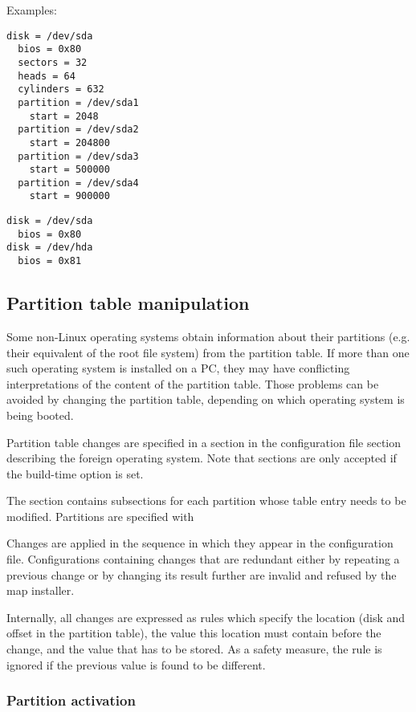 Examples:
\begin{verbatim}
disk = /dev/sda
  bios = 0x80
  sectors = 32
  heads = 64
  cylinders = 632
  partition = /dev/sda1
    start = 2048
  partition = /dev/sda2
    start = 204800
  partition = /dev/sda3
    start = 500000
  partition = /dev/sda4
    start = 900000
\end{verbatim}

\begin{verbatim}
disk = /dev/sda
  bios = 0x80
disk = /dev/hda
  bios = 0x81
\end{verbatim}


\subsection{Partition table manipulation}
\label{ptman}

Some non-Linux operating systems obtain information about their partitions
(e.g. their equivalent of the root file system) from the partition table.
If more than one such operating system is installed on a PC, they may have
conflicting interpretations of the content of the partition table. Those
problems can be avoided by changing the partition table, depending on which
operating system is being booted.

Partition table changes are specified in a  section in the
configuration file section describing the foreign operating system. Note
that  sections are only accepted if the build-time option
 is set.

The  section contains subsections for each partition whose
table entry needs to be modified. Partitions are specified with

Changes are applied in the sequence in which they appear in the
configuration file. Configurations containing changes that are redundant
either by repeating a previous change or by changing its result further
are invalid and refused by the map installer.

Internally, all changes are expressed as rules which specify the location
(disk and offset in the partition table), the value this location must
contain before the change, and the value that has to be stored. As a
safety measure, the rule is ignored if the previous value is found to be
different.


\subsubsection{Partition activation}

